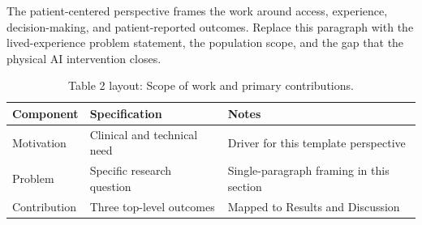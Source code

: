 
The patient-centered perspective frames the work around access, experience, decision-making, and patient-reported outcomes. Replace this paragraph with the lived-experience problem statement, the population scope, and the gap that the physical AI intervention closes.

\begin{table}[H]
\caption{Table 2 layout: Scope of work and primary contributions.}
\label{tab:intro_overview}
\centering
\begin{tabular}{>{\raggedright\arraybackslash}p{3.4cm} >{\raggedright\arraybackslash}p{4.6cm} >{\raggedright\arraybackslash}p{5.4cm}}
\toprule
\textbf{Component} & \textbf{Specification} & \textbf{Notes} \\
\midrule
  Motivation & Clinical and technical need & Driver for this template perspective \\
  Problem & Specific research question & Single-paragraph framing in this section \\
  Contribution & Three top-level outcomes & Mapped to Results and Discussion \\
\bottomrule
\end{tabular}
\end{table}
